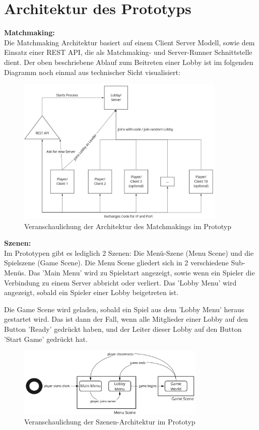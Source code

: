 \section{Architektur des Prototyps}
\label{Architektur}

\textbf{Matchmaking:} \\
Die Matchmaking Architektur basiert auf einem Client Server Modell, sowie dem Einsatz einer REST API, die als Matchmaking- und Server-Runner Schnittstelle dient. Der oben beschriebene Ablauf zum Beitreten einer Lobby ist im folgenden Diagramm noch einmal aus technischer Sicht visualisiert:

\begin{figure}[H]
	\centering
	\includegraphics[width=100mm]{images/prototype_architecture_matchmaking.jpg}
	\caption[Architektur Matchmaking Diagramm]{Veranschaulichung der Architektur des Matchmakings im Prototyp}
	\label{pic:prototype_architecture_matchmaking}
\end{figure}

\textbf{Szenen:} \\
Im Prototypen gibt es lediglich 2 Szenen: Die Menü-Szene (Menu Scene) und die Spielszene (Game Scene).
Die Menu Scene gliedert sich in 2 verschiedene Sub-Menüs. Das 'Main Menu' wird zu Spielstart angezeigt, sowie wenn ein Spieler die Verbindung zu einem Server abbricht oder verliert. Das 'Lobby Menu' wird angezeigt, sobald ein Spieler einer Lobby beigetreten ist. 

Die Game Scene wird geladen, sobald ein Spiel aus dem 'Lobby Menu' heraus gestartet wird. Das ist dann der Fall, wenn alle Mitglieder einer Lobby auf den Button 'Ready' gedrückt haben, und der Leiter dieser Lobby auf den Button 'Start Game' gedrückt hat. 

\begin{figure}[H]
	\centering
	\includegraphics[width=90mm]{images/scene_architecture.jpg}
	\caption[Architektur Szenen Diagramm]{Veranschaulichung der Szenen-Architektur im Prototyp}
	\label{pic:scene_architecture}
\end{figure}

